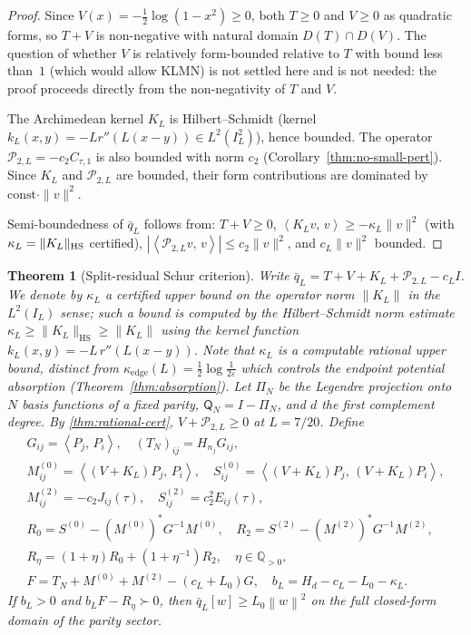 \documentclass[12pt,a4paper]{amsart}
\theoremstyle{plain}
\newtheorem{theorem}{Theorem}[section]
\theoremstyle{definition}
\newcommand{\Q}{\mathbb{Q}}
\newcommand{\qbar}{\bar{q}}
\newcommand{\ctwo}{c_2}              %
\newcommand{\kappae}{\kappa_{\mathrm{edge}}}
\newcommand{\Lzero}{L_0}             %
\newcommand{\norm}[1]{\left\|#1\right\|}
\newcommand{\ip}[2]{\left\langle #1,\, #2\right\rangle}
\begin{document}
\begin{proof}
Since $V(x) = -\tfrac12\log(1-x^2) \ge 0$, both $T \ge 0$ and $V \ge 0$ as
quadratic forms, so $T + V$ is non-negative with natural domain $D(T)\cap D(V)$.
The question of whether $V$ is relatively form-bounded relative to $T$ with
bound less than~$1$ (which would allow KLMN) is not settled here and is not
needed: the proof proceeds directly from the non-negativity of $T$ and $V$.

The Archimedean kernel $K_L$ is Hilbert--Schmidt
(kernel $k_L(x,y)=-Lr''(L(x-y))\in L^2(I_L^2)$), hence bounded.
The operator $\mathcal{P}_{2,L} = -\ctwo C_{\tau,1}$ is also bounded with norm
$\ctwo$ (Corollary~\ref{thm:no-small-pert}).
Since $K_L$ and $\mathcal{P}_{2,L}$ are bounded, their form contributions are
dominated by $\text{const}\cdot\|v\|^2$.

Semi-boundedness of $\qbar_L$ follows from: $T+V \ge 0$,
$\ip{K_L v}{v} \ge -\kappa_L\|v\|^2$ (with $\kappa_L = \|K_L\|_{\rm HS}$ certified),
$|\ip{\mathcal{P}_{2,L}v}{v}| \le \ctwo\|v\|^2$, and $c_L\|v\|^2$ bounded.
\end{proof}

\begin{theorem}[Split-residual Schur criterion]
\label{thm:schur}
Write $\qbar_L = T + V + K_L + \mathcal{P}_{2,L} - c_L I$.
We denote by $\kappa_L$ a certified upper bound on the operator norm
$\|K_L\|$ in the $L^2(I_L)$ sense; such a bound is computed by the
Hilbert--Schmidt norm estimate
$\kappa_L \ge \|K_L\|_{\mathrm{HS}} \ge \|K_L\|$
using the kernel function $k_L(x,y) = -L\,r''(L(x-y))$.
Note that $\kappa_L$ is a computable rational upper bound, distinct from
$\kappae(L) = \tfrac12\log\tfrac{1}{2\varepsilon}$ which controls the
endpoint potential absorption (Theorem~\ref{thm:absorption}).
Let $\Pi_N$ be the Legendre projection onto $N$ basis functions of a fixed
parity, $\mathsf{Q}_N = I - \Pi_N$, and $d$ the first complement degree.
By \cref{thm:rational-cert}, $V + \mathcal{P}_{2,L} \ge 0$ at $L = 7/20$.
Define
\begin{gather*}
  G_{ij} = \ip{P_j}{P_i},\quad
  (T_N)_{ij} = H_{n_j}G_{ij},\\
  M^{(0)}_{ij} = \ip{(V+K_L)P_j}{P_i},\quad
  S^{(0)}_{ij} = \ip{(V+K_L)P_j}{(V+K_L)P_i},\\
  M^{(2)}_{ij} = -\ctwo J_{ij}(\tau),\quad
  S^{(2)}_{ij} = \ctwo^2 E_{ij}(\tau),\\
  R_0 = S^{(0)} - (M^{(0)})^* G^{-1} M^{(0)},\quad
  R_2 = S^{(2)} - (M^{(2)})^* G^{-1} M^{(2)},\\
  R_\eta = (1+\eta)R_0 + (1+\eta^{-1})R_2,\quad \eta \in \Q_{>0},\\
  F = T_N + M^{(0)} + M^{(2)} - (c_L + \Lzero)G,\quad
  b_L = H_d - c_L - \Lzero - \kappa_L.
\end{gather*}
If $b_L > 0$ and $b_L F - R_\eta \succ 0$, then
$\qbar_L[w] \ge \Lzero\norm{w}^2$ on the full closed-form domain
of the parity sector.
\end{theorem}
\end{document}

